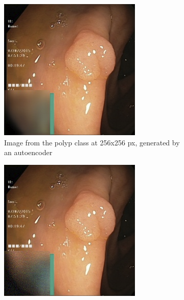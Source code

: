     \begin{figure}
        \centering
        \begin{subfigure}[t]{0.4\textwidth}
            \centering
            \includegraphics[width=\textwidth]{experiments/figures/greensquare/normalmissAE.png}
            \caption{Image from the polyp class at 256x256 px, generated by an autoencoder }   
            \label{fig:polyp_AE_SQUARE2}
        \end{subfigure}
        \qquad
        \begin{subfigure}[t]{0.4\textwidth}  
            \centering 
            \includegraphics[width=\textwidth]{experiments/figures/greensquare/normalmissGAN.png}

\end{subfigure}
\end{figure}
